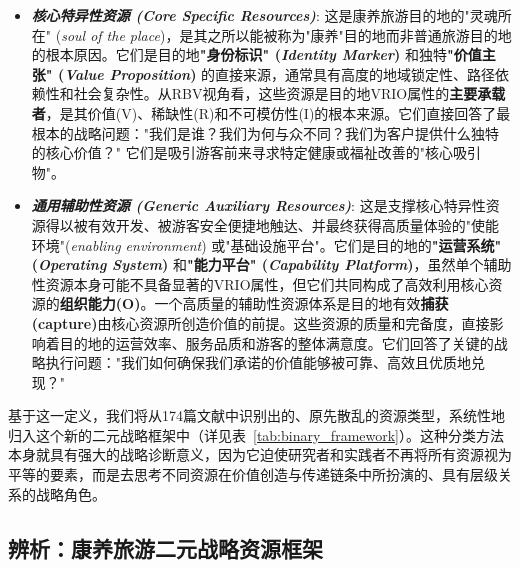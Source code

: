 \documentclass[UTF8, 12pt, a4paper, twoside]{ctexart}
\begin{document}
\begin{itemize}[leftmargin=*, nosep]
	\item \textbf{\textit{核心特异性资源 (Core Specific Resources)}}: 这是康养旅游目的地的"灵魂所在" (\textit{soul of the place})，是其之所以能被称为"康养"目的地而非普通旅游目的地的根本原因。它们是目的地\textbf{"身份标识" (\textit{Identity Marker})} 和独特\textbf{"价值主张" (\textit{Value Proposition})} 的直接来源，通常具有高度的地域锁定性、路径依赖性和社会复杂性。从RBV视角看，这些资源是目的地VRIO属性的\textbf{主要承载者}，是其价值(V)、稀缺性(R)和不可模仿性(I)的根本来源。它们直接回答了最根本的战略问题："我们是谁？我们为何与众不同？我们为客户提供什么独特的核心价值？" 它们是吸引游客前来寻求特定健康或福祉改善的"核心吸引物"。

	\item \textbf{\textit{通用辅助性资源 (Generic Auxiliary Resources)}}: 这是支撑核心特异性资源得以被有效开发、被游客安全便捷地触达、并最终获得高质量体验的"使能环境"(\textit{enabling environment}) 或"基础设施平台"。它们是目的地的\textbf{"运营系统" (\textit{Operating System})} 和\textbf{"能力平台" (\textit{Capability Platform})}，虽然单个辅助性资源本身可能不具备显著的VRIO属性，但它们共同构成了高效利用核心资源的\textbf{组织能力(O)}。一个高质量的辅助性资源体系是目的地有效\textbf{捕获(capture)}由核心资源所创造价值的前提。这些资源的质量和完备度，直接影响着目的地的运营效率、服务品质和游客的整体满意度。它们回答了关键的战略执行问题："我们如何确保我们承诺的价值能够被可靠、高效且优质地兑现？"
\end{itemize}

基于这一定义，我们将从174篇文献中识别出的、原先散乱的资源类型，系统性地归入这个新的二元战略框架中（详见表~\ref{tab:binary_framework}）。这种分类方法本身就具有强大的战略诊断意义，因为它迫使研究者和实践者不再将所有资源视为平等的要素，而是去思考不同资源在价值创造与传递链条中所扮演的、具有层级关系的战略角色。


\subsection{辨析：康养旅游二元战略资源框架}
\end{document}
